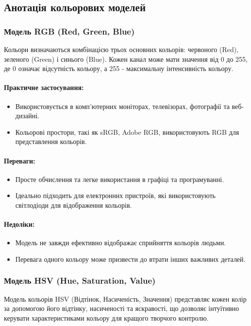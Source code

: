 \documentclass[oneside,14pt]{extarticle}
\begin{document}
\begin{normalsize}
	\subsection{Анотація кольорових моделей}
	\subsubsection{Модель RGB (Red, Green, Blue)}
	    Кольори визначаються комбінацією трьох основних кольорів: червоного (Red), зеленого (Green) і синього (Blue).
	Кожен канал може мати значення від 0 до 255, де 0 означає відсутність кольору, а 255 - максимальну інтенсивність кольору.
	
	\paragraph{Практичне застосування:}
	\begin{itemize}
		\item Використовується в комп'ютерних моніторах, телевізорах, фотографії та веб-дизайні.
		\item Кольорові простори, такі як sRGB, Adobe RGB, використовують RGB для представлення кольорів.
	\end{itemize}
	
	\paragraph{Переваги:}
	\begin{itemize}
		\item Просте обчислення та легке використання в графіці та програмуванні.
		\item Ідеально підходить для електронних пристроїв, які використовують світлодіоди для відображення кольорів.
	\end{itemize}
	
	\paragraph{Недоліки:}
	\begin{itemize}
		\item Модель не завжди ефективно відображає сприйняття кольорів людьми.
		\item Перевага одного кольору може призвести до втрати інших важливих деталей.
	\end{itemize}
	
	\subsubsection{Модель HSV (Hue, Saturation, Value)}
	Модель кольорів HSV (Відтінок, Насиченість, Значення) представляє кожен колір за допомогою його відтінку, насиченості та яскравості, що дозволяє інтуїтивно керувати характеристиками кольору для кращого творчого контролю.
	

\end{normalsize}
\end{document}
